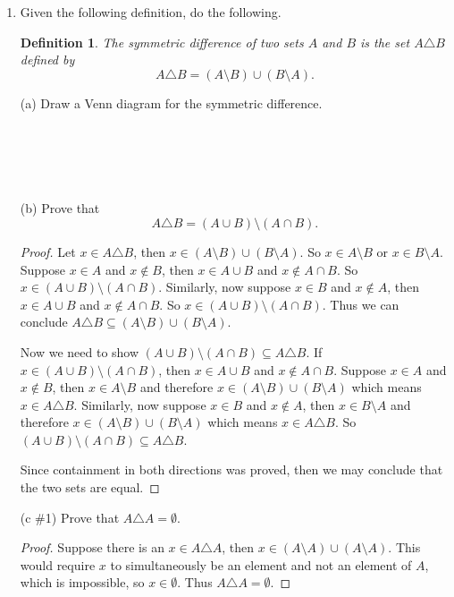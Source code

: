 \documentclass[12pt]{article}
\newtheorem{define}{Definition}
\begin{document}
\begin{enumerate}
\begin{proof}
			Therefore, $A\not\subset B$, $B\subset A$, $A\not\subseteq B$, and $B\subseteq A$.
		\end{proof}
	
		\newpage
		
		\item Given the following definition, do the following.
		\begin{define}
			The symmetric difference of two sets $A$ and $B$ is the set $A\triangle B$ defined by \[A\triangle B=(A\setminus B)\cup (B\setminus A).\]
		\end{define}
	
		(a) Draw a Venn diagram for the symmetric difference.\\ \\ \\ \\ \\ \\
			
		(b) Prove that \[A\triangle B=(A\cup B)\setminus(A\cap B). \]
			
		\begin{proof}
			Let $x\in A\triangle B$, then $x\in (A\setminus B) \cup (B\setminus A)$. So $x\in A\setminus B$ or $x\in B\setminus A$. Suppose $x\in A$ and $x\not\in B$, then $x\in A\cup B$ and $x\not\in A\cap B$. So $x\in (A\cup B)\setminus (A\cap B)$. Similarly, now suppose $x\in B$ and $x\not\in A$, then $x\in A\cup B$ and $x\not\in A\cap B$. So $x\in (A\cup B)\setminus (A\cap B)$. Thus we can conclude $A\triangle B \subseteq (A\setminus B) \cup (B\setminus A)$.
			
			Now we need to show $(A\cup B)\setminus(A\cap B) \subseteq A\triangle B$. If $x\in(A\cup B)\setminus(A\cap B)$, then $x\in A\cup B$ and $x\not\in A\cap B$. Suppose $x\in A$ and $x\not\in B$, then $x\in A\setminus B$ and therefore $x\in (A\setminus B)\cup(B\setminus A)$ which means $x\in A\triangle B$. Similarly, now suppose $x\in B$ and $x\not\in A$, then $x\in B\setminus A$ and therefore $x\in(A\setminus B)\cup(B\setminus A)$ which means $x\in A\triangle B$. So $(A\cup B)\setminus(A\cap B) \subseteq A\triangle B$.
			
			Since containment in both directions was proved, then we may conclude that the two sets are equal.
		\end{proof}
	
		(c \#1) Prove that $A\triangle A=\emptyset$.
		\begin{proof}
			Suppose there is an $x\in A\triangle A$, then $x\in (A\setminus A) \cup (A\setminus A)$. This would require $x$ to simultaneously be an element and not an element of $A$, which is impossible, so $x\in \emptyset$. Thus $A\triangle A=\emptyset$.
		\end{proof}
	

\end{enumerate}
\end{document}
